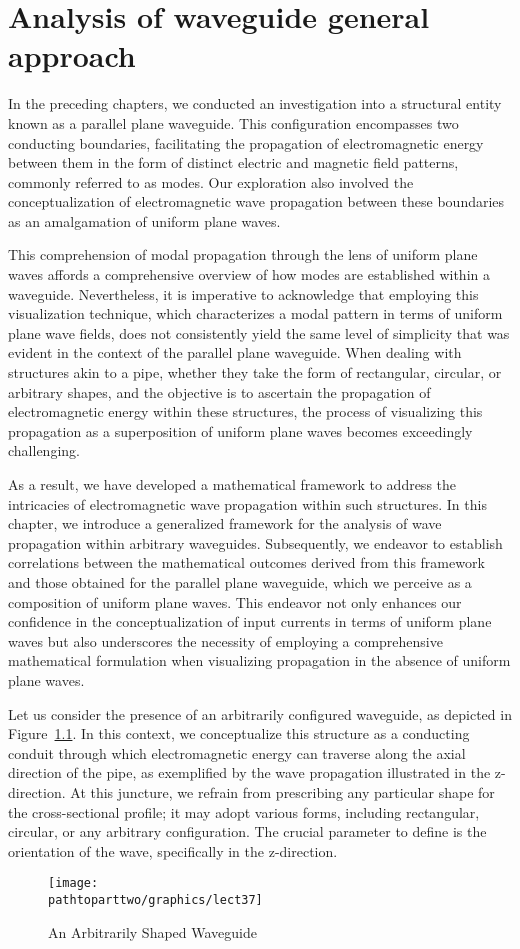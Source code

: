 \chapter{Analysis of waveguide general approach}
In the preceding chapters, we conducted an investigation into a structural entity known as a parallel plane waveguide. This configuration encompasses two conducting boundaries, facilitating the propagation of electromagnetic energy between them in the form of distinct electric and magnetic field patterns, commonly referred to as modes. Our exploration also involved the conceptualization of electromagnetic wave propagation between these boundaries as an amalgamation of uniform plane waves.

This comprehension of modal propagation through the lens of uniform plane waves affords a comprehensive overview of how modes are established within a waveguide. Nevertheless, it is imperative to acknowledge that employing this visualization technique, which characterizes a modal pattern in terms of uniform plane wave fields, does not consistently yield the same level of simplicity that was evident in the context of the parallel plane waveguide. When dealing with structures akin to a pipe, whether they take the form of rectangular, circular, or arbitrary shapes, and the objective is to ascertain the propagation of electromagnetic energy within these structures, the process of visualizing this propagation as a superposition of uniform plane waves becomes exceedingly challenging.

As a result, we have developed a mathematical framework to address the intricacies of electromagnetic wave propagation within such structures. In this chapter, we introduce a generalized framework for the analysis of wave propagation within arbitrary waveguides. Subsequently, we endeavor to establish correlations between the mathematical outcomes derived from this framework and those obtained for the parallel plane waveguide, which we perceive as a composition of uniform plane waves. This endeavor not only enhances our confidence in the conceptualization of input currents in terms of uniform plane waves but also underscores the necessity of employing a comprehensive mathematical formulation when visualizing propagation in the absence of uniform plane waves.

Let us consider the presence of an arbitrarily configured waveguide, as depicted in Figure~\ref{fig:lect37}. In this context, we conceptualize this structure as a conducting conduit through which electromagnetic energy can traverse along the axial direction of the pipe, as exemplified by the wave propagation illustrated in the z-direction. At this juncture, we refrain from prescribing any particular shape for the cross-sectional profile; it may adopt various forms, including rectangular, circular, or any arbitrary configuration. The crucial parameter to define is the orientation of the wave, specifically in the z-direction.
\begin{figure}[h]
\centering
\texttt{[image: \\pathtoparttwo/graphics/lect37]}
\caption{An Arbitrarily Shaped Waveguide}
\label{fig:lect37}
\end{figure}
    
